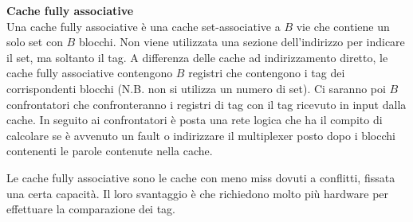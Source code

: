 \begin{defn}
    \textbf{Cache fully associative} \\
    Una cache fully associative è una cache set-associative a $B$ vie che
    contiene un solo set con $B$ blocchi. Non viene utilizzata una sezione
    dell'indirizzo per indicare il set, ma soltanto il tag. A differenza delle
    cache ad indirizzamento diretto, le cache fully associative contengono $B$
    registri che contengono i tag dei corrispondenti blocchi (N.B. non si
    utilizza un numero di set). Ci saranno poi $B$ confrontatori che
    confronteranno i registri di tag con il tag ricevuto in input dalla cache.
    In seguito ai confrontatori è posta una rete logica che ha il compito di
    calcolare se è avvenuto un fault o indirizzare il multiplexer posto dopo i
    blocchi contenenti le parole contenute nella cache.


    Le cache fully associative sono le
    cache con meno miss dovuti a conflitti, fissata una certa capacità. Il loro
    svantaggio è che richiedono molto più hardware per effettuare la
    comparazione dei tag.
\end{defn}


